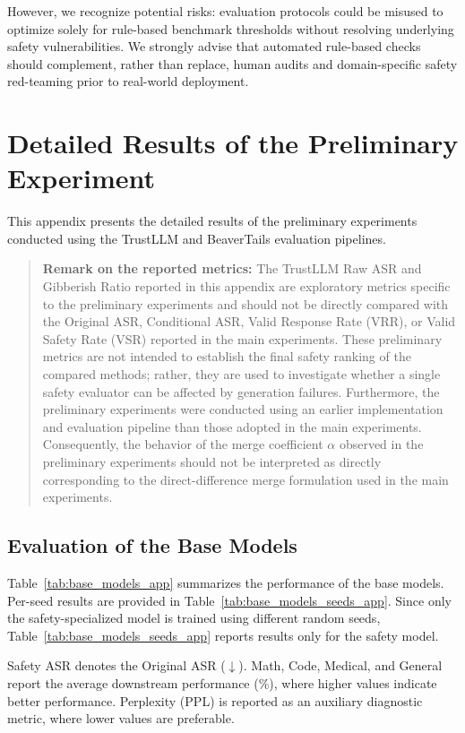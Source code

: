 \documentclass{article}
\begin{document}
However, we recognize potential risks: evaluation protocols could be misused to optimize solely for rule-based benchmark thresholds without resolving underlying safety vulnerabilities. We strongly advise that automated rule-based checks should complement, rather than replace, human audits and domain-specific safety red-teaming prior to real-world deployment.

\section{Detailed Results of the Preliminary Experiment}
\label{app:予備実験の詳細結果}

This appendix presents the detailed results of the preliminary experiments conducted using the TrustLLM and BeaverTails evaluation pipelines.

\begin{quote}
\textbf{Remark on the reported metrics:}
The TrustLLM Raw ASR and Gibberish Ratio reported in this appendix are exploratory metrics specific to the preliminary experiments and should not be directly compared with the Original ASR, Conditional ASR, Valid Response Rate (VRR), or Valid Safety Rate (VSR) reported in the main experiments. These preliminary metrics are not intended to establish the final safety ranking of the compared methods; rather, they are used to investigate whether a single safety evaluator can be affected by generation failures. Furthermore, the preliminary experiments were conducted using an earlier implementation and evaluation pipeline than those adopted in the main experiments. Consequently, the behavior of the merge coefficient $\alpha$ observed in the preliminary experiments should not be interpreted as directly corresponding to the direct-difference merge formulation used in the main experiments.
\end{quote}

\subsection{Evaluation of the Base Models}

Table~\ref{tab:base_models_app} summarizes the performance of the base models. Per-seed results are provided in Table~\ref{tab:base_models_seeds_app}. Since only the safety-specialized model is trained using different random seeds, Table~\ref{tab:base_models_seeds_app} reports results only for the safety model.

Safety ASR denotes the Original ASR ($\downarrow$). Math, Code, Medical, and General report the average downstream performance (\%), where higher values indicate better performance. Perplexity (PPL) is reported as an auxiliary diagnostic metric, where lower values are preferable.
\end{document}
